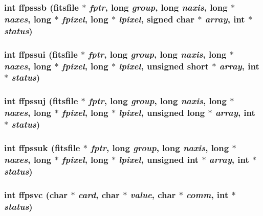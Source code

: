 \subsubsection{\setlength{\rightskip}{0pt plus 5cm}int ffpsssb (\bf{fitsfile} $\ast$ {\em fptr}, long {\em group}, long {\em naxis}, long $\ast$ {\em naxes}, long $\ast$ {\em fpixel}, long $\ast$ {\em lpixel}, signed char $\ast$ {\em array}, int $\ast$ {\em status})}\label{src_2fitsio_8h_169a2bd7cc6b4306fac13a357df4dcf0}


\subsubsection{\setlength{\rightskip}{0pt plus 5cm}int ffpssui (\bf{fitsfile} $\ast$ {\em fptr}, long {\em group}, long {\em naxis}, long $\ast$ {\em naxes}, long $\ast$ {\em fpixel}, long $\ast$ {\em lpixel}, unsigned short $\ast$ {\em array}, int $\ast$ {\em status})}\label{src_2fitsio_8h_f72bb4b9e6bf54650b3442d4fe08e50a}


\subsubsection{\setlength{\rightskip}{0pt plus 5cm}int ffpssuj (\bf{fitsfile} $\ast$ {\em fptr}, long {\em group}, long {\em naxis}, long $\ast$ {\em naxes}, long $\ast$ {\em fpixel}, long $\ast$ {\em lpixel}, unsigned long $\ast$ {\em array}, int $\ast$ {\em status})}\label{src_2fitsio_8h_59750e86feb6356e01a6ce684dad31d1}


\subsubsection{\setlength{\rightskip}{0pt plus 5cm}int ffpssuk (\bf{fitsfile} $\ast$ {\em fptr}, long {\em group}, long {\em naxis}, long $\ast$ {\em naxes}, long $\ast$ {\em fpixel}, long $\ast$ {\em lpixel}, unsigned int $\ast$ {\em array}, int $\ast$ {\em status})}\label{src_2fitsio_8h_6211df3aa144d88cda8fd8fe8eade594}


\subsubsection{\setlength{\rightskip}{0pt plus 5cm}int ffpsvc (char $\ast$ {\em card}, char $\ast$ {\em value}, char $\ast$ {\em comm}, int $\ast$ {\em status})}\label{src_2fitsio_8h_9a1a8933359feb3576cc14a1e5c671c5}



